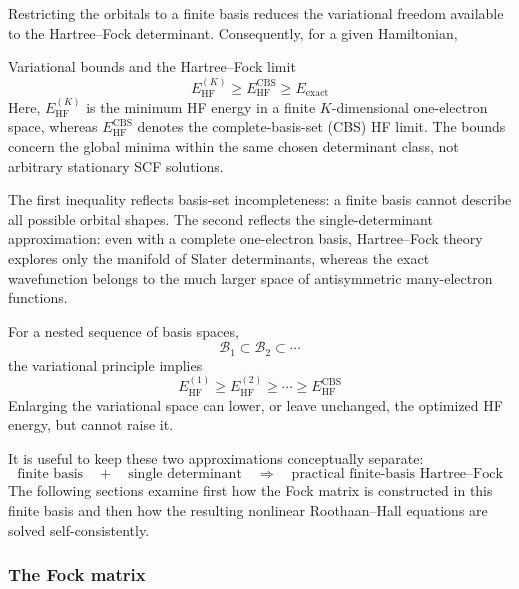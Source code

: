 \documentclass[11pt,a4paper,titlepage]{article}
\numberwithin{equation}{section}
\begin{document}
Restricting the orbitals to a finite basis reduces the variational freedom
available to the Hartree--Fock determinant. Consequently, for a given
Hamiltonian,
\begin{hftheorem}{Variational bounds and the Hartree--Fock limit}
\begin{equation}
  E_\text{HF}^{(K)}
  \geq
  E_\text{HF}^{\text{CBS}}
  \geq
  E_\text{exact}
  \label{eq:hf-basis-variational-hierarchy}
\end{equation}
Here, $E_\text{HF}^{(K)}$ is the minimum HF energy in a finite
$K$-dimensional one-electron space, whereas
$E_\text{HF}^{\text{CBS}}$ denotes the complete-basis-set (CBS) HF limit.
The bounds concern the global minima within the same chosen determinant
class, not arbitrary stationary SCF solutions.
\end{hftheorem}

The first inequality reflects basis-set incompleteness: a finite basis
cannot describe all possible orbital shapes. The second reflects the
single-determinant approximation: even with a complete one-electron
basis, Hartree--Fock theory explores only the manifold of Slater
determinants, whereas the exact wavefunction belongs to the much larger
space of antisymmetric many-electron functions.

For a nested sequence of basis spaces,
\begin{equation}
  \mathcal{B}_1
  \subset
  \mathcal{B}_2
  \subset
  \cdots
\end{equation}
the variational principle implies
\begin{equation}
  E_\text{HF}^{(1)}
  \geq
  E_\text{HF}^{(2)}
  \geq
  \cdots
  \geq
  E_\text{HF}^{\text{CBS}}
\end{equation}
Enlarging the variational space can lower, or leave unchanged, the optimized
HF energy, but cannot raise it.

It is useful to keep these two approximations conceptually separate:
\begin{equation}
  \boxed{\text{finite basis}
  \quad+\quad
  \text{single determinant}
  \quad\Longrightarrow\quad
  \text{practical finite-basis Hartree--Fock}}
\end{equation}
The following sections examine first how the Fock matrix is constructed in
this finite basis and then how the resulting nonlinear Roothaan--Hall
equations are solved self-consistently.

\subsubsection{The Fock matrix}
\end{document}

